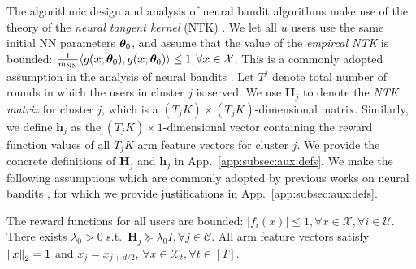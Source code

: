 The algorithmic design and analysis of neural bandit algorithms make use of the theory of the \emph{neural tangent kernel} (NTK) \cite{jacot2018neural}.
We let all $u$ users use the same initial NN parameters $\boldsymbol{\theta}_0$, and assume that the value of the \emph{empircal NTK} is bounded: $\frac{1}{m_{\text{NN}}}\langle g(\boldsymbol{x};\boldsymbol{\theta}_0), g(\boldsymbol{x};\boldsymbol{\theta}_0) \rangle \leq 1,\forall \boldsymbol{x} \in \mathcal{X}$.
This is a commonly adopted assumption in the analysis of neural bandits \cite{ICLR23_dai2022federated,kassraie2021neural}. 
Let $T^j$ denote total number of rounds in which the users in cluster $j$ is served. 
We use $\mathbf{H}_j$ to denote the \emph{NTK matrix} \cite{zhou2020neural} for cluster $j$, which is a $(T_j K) \times (T_j K)$-dimensional matrix.
Similarly, we define $\mathbf{h}_j$ as the $(T_j K)\times 1$-dimensional vector containing the reward function values of all $T_j K$ arm feature vectors for cluster $j$.
We provide the concrete definitions of $\mathbf{H}_j$ and $\mathbf{h}_j$ in App.~\ref{app:subsec:aux:defs}.
We make the following assumptions which are commonly adopted by previous works on neural bandits \cite{zhou2020neural,zhang2020neural},
for which we provide justifications in App.~\ref{app:subsec:aux:defs}.
\begin{assumption}
\label{assumption:main:neural}
The reward functions for all users are bounded: $|f_i(x)| \leq 1,\forall x\in\mathcal{X},\forall i\in\mathcal{U}$. 
There exists $\lambda_0 > 0$ s.t.~$\mathbf{H}_j \succeq \lambda_0 I, \forall j\in\mathcal{C}$. 
All 
arm feature vectors satisfy $\left\| x \right\|_{2}=1$ and $x_{j}=x_{j+d/2}$, $\forall x\in\mathcal{X}_{t},\forall t\in[T]$.
\end{assumption}

